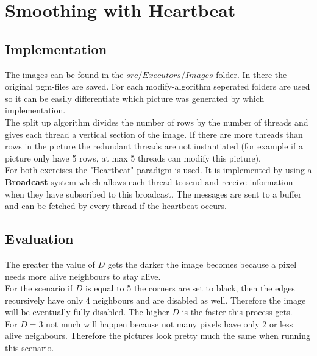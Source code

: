 \documentclass{article}
\begin{document}
	\pagestyle{fancy}
	\section{Smoothing with Heartbeat}
	\begin{adjustwidth}{2em}{2em}
		\subsection{Implementation}
		\begin{adjustwidth}{2em}{2em}
			The images can be found in the $src/Executors/Images$ folder. In there the original pgm-files are saved. For each modify-algorithm seperated folders are used so it can be easily differentiate which picture was generated by which implementation. \\
			The split up algorithm divides the number of rows by the number of threads and gives each thread a vertical section of the image. If there are more threads than rows in the picture the redundant threads are not instantiated (for example if a picture only have 5 rows, at max 5 threads can modify this picture). \\
			For both exercises the "Heartbeat" paradigm is used. It is implemented by using a \textbf{Broadcast} system which allows each thread to send and receive information when they have subscribed to this broadcast. The messages are sent to a buffer and can be fetched by every thread if the heartbeat occurs.
		\end{adjustwidth}
		\subsection{Evaluation}
		\begin{adjustwidth}{2em}{2em}
			The greater the value of $D$ gets the darker the image becomes because a pixel needs more alive neighbours to stay alive. \\
			For the scenario if $D$ is equal to 5 the corners are set to black, then the edges recursively have only 4 neighbours and are disabled as well. Therefore the image will be eventually fully disabled. The higher $D$ is the faster this process gets. \\
			For $D = 3$ not much will happen because not many pixels have only 2 or less alive neighbours. Therefore the pictures look pretty much the same when running this scenario.

\end{adjustwidth}
\end{adjustwidth}
\end{document}
